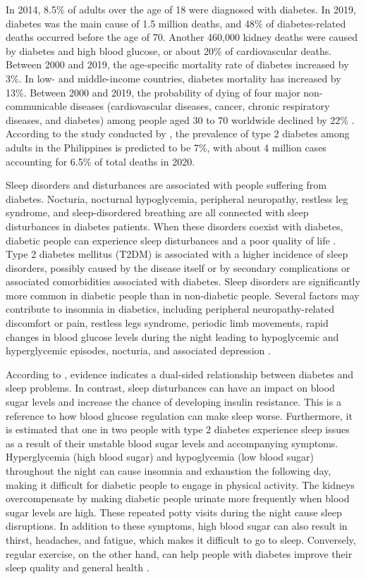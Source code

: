 In 2014, 8.5\% of adults over the age of 18 were diagnosed with diabetes. In
2019, diabetes was the main cause of 1.5 million deaths, and 48\% of
diabetes-related deaths occurred before the age of 70. Another 460,000 kidney
deaths were caused by diabetes and high blood glucose, or about 20\% of
cardiovascular deaths. Between 2000 and 2019, the age-specific mortality rate of
diabetes increased by 3\%. In low- and middle-income countries, diabetes
mortality has increased by 13\%. Between 2000 and 2019, the probability of dying
of four major non-communicable diseases (cardiovascular diseases, cancer,
chronic respiratory diseases, and diabetes) among people aged 30 to 70 worldwide
declined by 22\% \parencite{who-2023-mortality}. According to the study
conducted by \textcite{paluyo-2022}, the prevalence of type 2 diabetes
among adults in the Philippines is predicted to be 7\%, with about 4 million
cases accounting for 6.5\% of total deaths in 2020.

Sleep disorders and disturbances are associated with people suffering from
diabetes. Nocturia, nocturnal hypoglycemia, peripheral neuropathy, restless leg
syndrome, and sleep-disordered breathing are all connected with sleep
disturbances in diabetes patients. When these disorders coexist with diabetes,
diabetic people can experience sleep disturbances and a poor quality of life
\parencite{surani-2015}. Type 2 diabetes mellitus (T2DM) is associated with a
higher incidence of sleep disorders, possibly caused by the disease itself or by
secondary complications or associated comorbidities associated with diabetes.
Sleep disorders are significantly more common in diabetic people than in
non-diabetic people. Several factors may contribute to insomnia in diabetics,
including peripheral neuropathy-related discomfort or pain, restless legs
syndrome, periodic limb movements, rapid changes in blood glucose levels during
the night leading to hypoglycemic and hyperglycemic episodes, nocturia, and
associated depression \parencite{khandelwal-2017}.

According to \textcite{morales-brown-2022}, evidence indicates a dual-sided
relationship between diabetes and sleep problems. In contrast, sleep
disturbances can have an impact on blood sugar levels and increase the chance of
developing insulin resistance. This is a reference to how blood glucose
regulation can make sleep worse. Furthermore, it is estimated that one in two
people with type 2 diabetes experience sleep issues as a result of their
unstable blood sugar levels and accompanying symptoms. Hyperglycemia (high blood
sugar) and hypoglycemia (low blood sugar) throughout the night can cause
insomnia and exhaustion the following day, making it difficult for diabetic
people to engage in physical activity. The kidneys overcompensate by making
diabetic people urinate more frequently when blood sugar levels are high. These
repeated potty visits during the night cause sleep disruptions. In addition to
these symptoms, high blood sugar can also result in thirst, headaches, and
fatigue, which makes it difficult to go to sleep. Conversely, regular exercise,
on the other hand, can help people with diabetes improve their sleep quality and
general health \parencite{pacheco-2023}.

